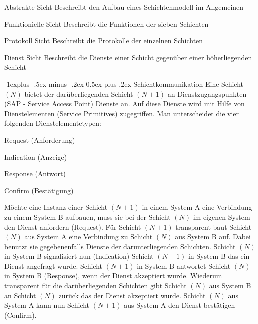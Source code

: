 \documentclass[10pt,landscape]{article}
\makeatletter
\renewcommand{\subsection}{\@startsection{subsection}{2}{0mm}%
                                {-1explus -.5ex minus -.2ex}%
                                {0.5ex plus .2ex}%
                                {\normalfont\normalsize\bfseries}}
\makeatother
\begin{document}
\begin{multicols}{3}
    \begin{description*}
        \item[Abstrakte Sicht] Beschreibt den Aufbau eines Schichtenmodell im Allgemeinen
        \item[Funktionielle Sicht] Beschreibt die Funktionen der sieben Schichten
        \item[Protokoll Sicht] Beschreibt die Protokolle der einzelnen Schichten
        \item[Dienst Sicht] Beschreibt die Dienste einer Schicht gegenüber einer höherliegenden Schicht    
    \end{description*}
    
    \subsection{Schichtkommunikation}
    Eine Schicht $(N)$ bietet der darüberliegenden Schicht $(N +1)$ an Dienstzugangspunkten (SAP - Service Access Point) Dienste an. Auf diese Dienste wird mit Hilfe von Dienstelementen (Service Primitives) zugegriffen. Man unterscheidet die vier folgenden Dienstelementetypen:
    \begin{itemize*}
        \item Request (Anforderung)
        \item Indication (Anzeige)
        \item Response (Antwort)
        \item Confirm (Bestätigung)
    \end{itemize*}
    Möchte eine Instanz einer Schicht $(N+1)$ in einem System A eine Verbindung zu einem System B aufbauen, muss sie bei der Schicht $(N)$ im eigenen System den Dienst anfordern (Request). 
    Für Schicht $(N+1)$ transparent baut Schicht $(N)$ aus System A eine Verbindung zu Schicht $(N)$ aus System B auf. Dabei benutzt sie gegebenenfalls Dienste der darunterliegenden Schichten. 
    Schicht $(N )$ in System B signalisiert nun (Indication) Schicht $(N+1)$ in System B das ein Dienst angefragt wurde. 
    Schicht $(N +1)$ in System B antwortet Schicht $(N)$ in System B (Response), wenn der Dienst akzeptiert wurde. 
    Wiederum transparent für die darüberliegenden Schichten gibt Schicht $(N)$ aus System B an Schicht $(N )$ zurück das der Dienst akzeptiert wurde. Schicht $(N)$ aus System A kann nun Schicht $(N+1)$ aus System A den Dienst bestätigen (Confirm).
    
    \newpage
    

\end{multicols}
\end{document}
